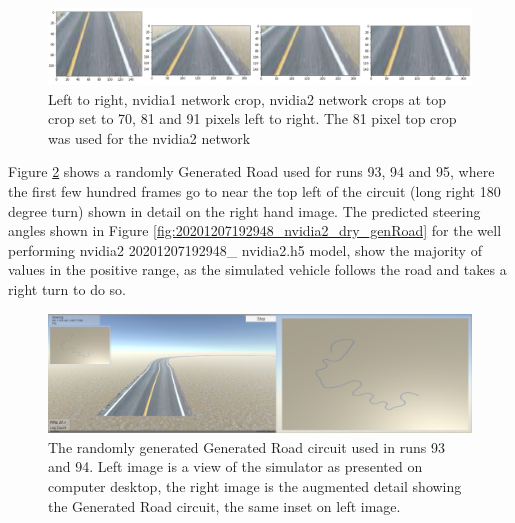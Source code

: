 
\begin{figure}[h!]
 \centering 
 \includegraphics[width=\textwidth]{Figures/nvidia1x1_nvidia2x3_crops.png}
 \caption{Left to right, nvidia1 network crop, nvidia2 network crops at top crop set to 70, 81 and 91 pixels left to right. The 81 pixel top crop was used for the nvidia2 network}
 \label{fig:nvidia1x1_nvidia2x3_crops_results} %
\end{figure}

Figure \ref{fig:run-93-94-generated-road-res} shows a randomly Generated Road used for runs 93, 94 and 95, where the first few hundred frames go to near the top left of the circuit (long right 180 degree turn) shown in detail on the right hand image. The predicted steering angles shown in Figure  \ref{fig:20201207192948_nvidia2_dry_genRoad} for the well performing nvidia2 20201207192948\_ nvidia2.h5 model, show the majority of values in the positive range, as the simulated vehicle follows the road and takes a right turn to do so.


\begin{figure}[h!]
 \centering 
 \includegraphics[width=\textwidth]{Figures/run-93-94-generated-road.png}
 \caption{The randomly generated Generated Road circuit used in runs 93 and 94. Left image is a view of the simulator as presented on computer desktop, the right image is the augmented detail showing the Generated Road circuit, the same inset on left image.}
 \label{fig:run-93-94-generated-road-res} 
\end{figure}




